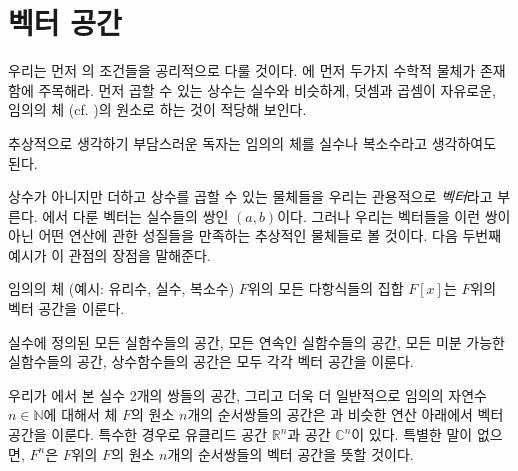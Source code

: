 \section{벡터 공간}
우리는 먼저 의 조건들을 공리적으로 다룰 것이다.
에 먼저 두가지 수학적 물체가 존재함에 주목해라.
먼저 곱할 수 있는 상수는 실수와 비슷하게, 덧셈과 곱셈이 자유로운, 임의의 체 (cf. )의 원소로 하는 것이 적당해 보인다.
\begin{remark}
    추상적으로 생각하기 부담스러운 독자는 임의의 체를 실수나 복소수라고 생각하여도 된다.
\end{remark}

상수가 아니지만 더하고 상수를 곱할 수 있는 물체들을 우리는 관용적으로 \textit{벡터}라고 부른다.
에서 다룬 벡터는 실수들의 쌍인 $(a, b)$이다.
그러나 우리는 벡터들을 이런 쌍이 아닌 어떤 연산에 관한 성질들을 만족하는 추상적인 물체들로 볼 것이다.
다음 두번째 예시가 이 관점의 장점을 말해준다.

\begin{example}
    임의의 체 (예시: 유리수, 실수, 복소수) $F$위의 모든 다항식들의 집합 $F[x]$는 $F$위의 벡터 공간을 이룬다.
\end{example}
\begin{example}
    실수에 정의된 모든 실함수들의 공간, 모든 연속인 실함수들의 공간, 모든 미분 가능한 실함수들의 공간, 상수함수들의 공간은 모두 각각 벡터 공간을 이룬다.
\end{example}
\begin{example}
    우리가 에서 본 실수 2개의 쌍들의 공간, 그리고 더욱 더 일반적으로 임의의 자연수 $n \in \mathbb{N}$에 대해서 체 $F$의 원소 $n$개의 순서쌍들의 공간은 과 비슷한 연산 아래에서 벡터 공간을 이룬다.
    특수한 경우로 유클리드 공간 $\mathbb{R}^n$과 공간 $\mathbb{C}^n$이 있다.
    특별한 말이 없으면, $F^n$은 $F$위의 $F$의 원소 $n$개의 순서쌍들의 벡터 공간을 뜻할 것이다.
\end{example}


